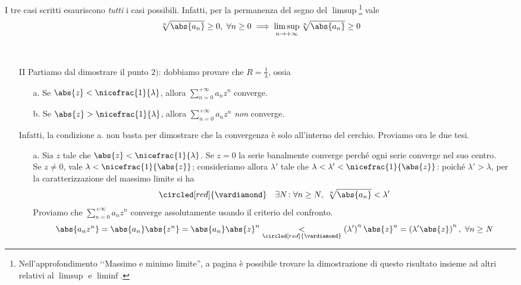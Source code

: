 \begin{observe}
	I tre casi scritti esauriscono \textit{tutti} i casi possibili. Infatti, per la permanenza del segno del $\limsup$\footnote{Nell'approfondimento ‘‘Massimo e minimo limite'', a pagina \pageref{limsuppermanenzadelsegno} è possibile trovare la dimostrazione di questo risultato insieme ad altri relativi al $\limsup$ e $\liminf$.} vale
	\begin{equation*}
		\sqrt[n]{\abs{a_n}}\geq 0,\ \forall n\geq 0\implies\limsup_{n\to+\infty}\sqrt[n]{\abs{a_n}}\geq 0
	\end{equation*}
\end{observe}
\begin{demonstrationcaputwt}~
	\begin{enumerate}[label=\Roman*]
		\item[II] 	Partiamo dal dimostrare il punto $2)$: dobbiamo provare che $R=\frac{1}{\lambda}$, ossia
		\begin{itemize}
			\item[a.] Se $\abs{z}<\nicefrac{1}{\lambda}$, allora $\displaystyle\sum_{n=0}^{+\infty}a_nz^n$ converge.
			\item[b.] Se $\abs{z}>\nicefrac{1}{\lambda}$, allora $\displaystyle\sum_{n=0}^{+\infty}a_nz^n$ \textit{non} converge.
		\end{itemize}
		Infatti, la condizione a. non basta per dimostrare che la convergenza è solo all'interno del cerchio. Proviamo ora le due tesi.
		\begin{itemize}
			\item[a.]	 Sia $z$ tale che $\abs{z}<\nicefrac{1}{\lambda}$. Se $z=0$ la serie banalmente converge perché ogni serie converge nel suo centro.\\
			Se $z\neq 0$, vale $\lambda<\nicefrac{1}{\abs{z}}$; consideriamo allora $\lambda'$ tale che $\lambda<\lambda'<\nicefrac{1}{\abs{z}}$: poiché $\lambda'>\lambda$, per la caratterizzazione del massimo limite si ha
			\begin{equation*}
				\circled[red]{\vardiamond}\quad\exists N\colon\forall n\geq N,\ \sqrt[n]{\abs{a_n}}<\lambda'
			\end{equation*}
			Proviamo che $\displaystyle\sum_{n=0}^{+\infty}a_nz^n$ converge assolutamente usando il criterio del confronto.
			\begin{equation*}
				\abs{a_nz^n}=\abs{a_n}\abs{z^n}=\abs{a_n}\abs{z}^n\underset{\circled[red]{\vardiamond}}{<} \left(\lambda'\right)^n\abs{z}^n=\left(\lambda'\abs{z}\right)^n,\ \forall n\geq N

\end{equation*}
\end{itemize}
\end{enumerate}
\end{demonstrationcaputwt}
